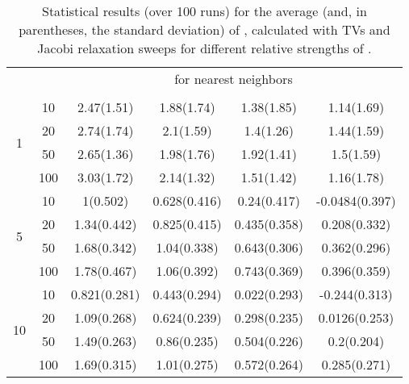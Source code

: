 \documentclass[final]{siamltex}
\begin{document}
\begin{table}[h]
\begin{center}







{
\begin{tabular}{|c|c|cccc|}
\hline
& & \multicolumn{4}{c|}{ for  nearest neighbors} \\ \cline{3-6}
 &  &  &  &  &  \\
\hline
\multicolumn{1}{|c|}{\multirow{4}{*}{1}} &
\multicolumn{1}{|c|}{10} & 2.47(1.51) & 1.88(1.74) & 1.38(1.85) & 1.14(1.69)\\
\multicolumn{1}{|c|}{}                        &
\multicolumn{1}{|c|}{20} & 2.74(1.74) & 2.1(1.59) & 1.4(1.26) & 1.44(1.59) \\
\multicolumn{1}{|c|}{}                        &
\multicolumn{1}{|c|}{50} & 2.65(1.36) & 1.98(1.76) & 1.92(1.41) & 1.5(1.59) \\
\multicolumn{1}{|c|}{}                        &
\multicolumn{1}{|c|}{100}& 3.03(1.72) & 2.14(1.32) & 1.51(1.42) & 1.16(1.78) \\
\hline
\multicolumn{1}{|c|}{\multirow{4}{*}{5}} &
\multicolumn{1}{|c|}{10} & 1(0.502) & 0.628(0.416) & 0.24(0.417) & -0.0484(0.397)\\
\multicolumn{1}{|c|}{}                        &
\multicolumn{1}{|c|}{20} & 1.34(0.442) & 0.825(0.415) & 0.435(0.358) & 0.208(0.332) \\
\multicolumn{1}{|c|}{}                        &
\multicolumn{1}{|c|}{50} & 1.68(0.342) & 1.04(0.338) & 0.643(0.306) & 0.362(0.296) \\
\multicolumn{1}{|c|}{}                        &
\multicolumn{1}{|c|}{100} &1.78(0.467) & 1.06(0.392) & 0.743(0.369) & 0.396(0.359) \\
\hline
\multicolumn{1}{|c|}{\multirow{4}{*}{10}} &
\multicolumn{1}{|c|}{10} & 0.821(0.281) & 0.443(0.294) & 0.022(0.293) & -0.244(0.313) \\
\multicolumn{1}{|c|}{}                        &
\multicolumn{1}{|c|}{20} &1.09(0.268) & 0.624(0.239) & 0.298(0.235) & 0.0126(0.253) \\
\multicolumn{1}{|c|}{}                        &
\multicolumn{1}{|c|}{50} & 1.49(0.263) & 0.86(0.235) & 0.504(0.226) & 0.2(0.204) \\
\multicolumn{1}{|c|}{}                        &
\multicolumn{1}{|c|}{100} & 1.69(0.315) & 1.01(0.275) & 0.572(0.264) & 0.285(0.271) \\
\hline
\end{tabular}
}

\caption{Statistical results (over 100 runs) for the average (and, in parentheses,
the standard deviation) of , calculated with
 TVs and  Jacobi relaxation sweeps for different relative strengths of .}
\label{tab:meshexampleDiag}
\end{center}
\end{table}
\end{document}
